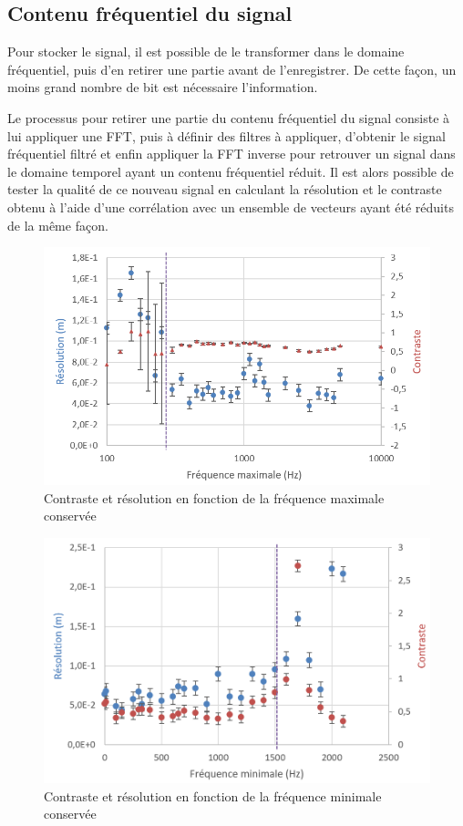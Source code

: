 \documentclass[11pt,letterpaper]{article}
\begin{document}
\subsection{Contenu fréquentiel du signal}

Pour stocker le signal, il est possible de le transformer dans le domaine 
fréquentiel, puis d'en retirer une partie avant de l'enregistrer. De cette 
façon, un moins grand nombre de bit est nécessaire l'information.

Le processus pour retirer une partie du contenu fréquentiel du signal consiste
à lui appliquer une FFT, puis à définir des filtres à appliquer, d'obtenir le
signal fréquentiel filtré et enfin appliquer la FFT inverse pour retrouver
un signal dans le domaine temporel ayant un contenu fréquentiel réduit. 
Il est alors possible de tester la qualité de ce nouveau signal en calculant
la résolution et le contraste obtenu à l'aide d'une corrélation avec un 
ensemble de vecteurs ayant été réduits de la même façon.



\begin{figure}[ht]
    \centering
    \includegraphics[scale=0.8]{Freqmax_graph.png}
    \caption{Contraste et résolution en fonction de la fréquence maximale conservée}
    \label{fmax_fig}
\end{figure}


\begin{figure}[ht]
    \centering
    \includegraphics[scale=0.7]{Freqmin_graph.png}
    \caption{Contraste et résolution en fonction de la fréquence minimale conservée}
    \label{fmin_fig}
\end{figure}
\end{document}
